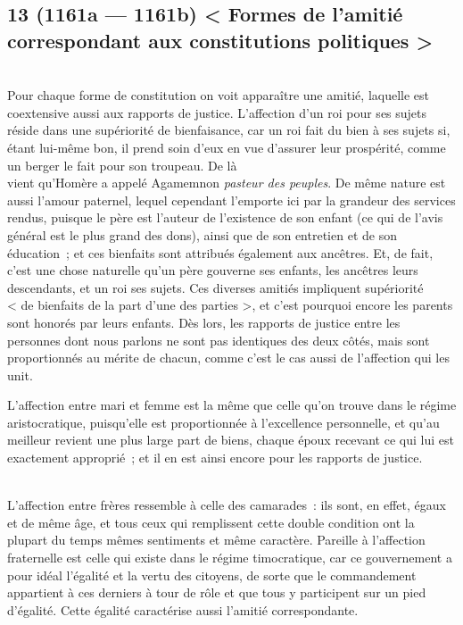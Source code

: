 \documentclass[french,twoside]{book} %
\begin{document}
\subsection[{13 (1161a — 1161b) < Formes de l’amitié correspondant aux constitutions politiques >}]{13 (1161a — 1161b) < Formes de l’amitié correspondant aux constitutions politiques >}
\noindent \\
Pour chaque forme de constitution on voit apparaître une amitié, laquelle est coextensive aussi aux rapports de justice. L’affection d’un roi pour ses sujets réside dans une supériorité de bienfaisance, car un roi fait du bien à ses sujets si, étant lui-même bon, il prend soin d’eux en vue d’assurer leur prospérité, comme un berger le fait pour son troupeau. De là \\
vient qu’Homère a appelé Agamemnon {\itshape pasteur des peuples}. De même nature est aussi l’amour paternel, lequel cependant l’emporte ici par la grandeur des services rendus, puisque le père est l’auteur de l’existence de son enfant (ce qui de l’avis général est le plus grand des dons), ainsi que de son entretien et de son éducation ; et ces bienfaits sont attribués également aux ancêtres. Et, de fait, c’est une chose naturelle qu’un père gouverne ses enfants, les ancêtres leurs descendants, et un roi ses sujets. Ces diverses amitiés impliquent supériorité \\
< de bienfaits de la part d’une des parties >, et c’est pourquoi encore les parents sont honorés par leurs enfants. Dès lors, les rapports de justice entre les personnes dont nous parlons ne sont pas identiques des deux côtés, mais sont proportionnés au mérite de chacun, comme c’est le cas aussi de l’affection qui les unit.\par
L’affection entre mari et femme est la même que celle qu’on trouve dans le régime aristocratique, puisqu’elle est proportionnée à l’excellence personnelle, et qu’au meilleur revient une plus large part de biens, chaque époux recevant ce qui lui est exactement approprié ; et il en est ainsi encore pour les rapports de justice.\par
\\
L’affection entre frères ressemble à celle des camarades : ils sont, en effet, égaux et de même âge, et tous ceux qui remplissent cette double condition ont la plupart du temps mêmes sentiments et même caractère. Pareille à l’affection fraternelle est celle qui existe dans le régime timocratique, car ce gouvernement a pour idéal l’égalité et la vertu des citoyens, de sorte que le commandement appartient à ces derniers à tour de rôle et que tous y participent sur un pied d’égalité. Cette égalité caractérise aussi l’amitié correspondante.\par
\end{document}
